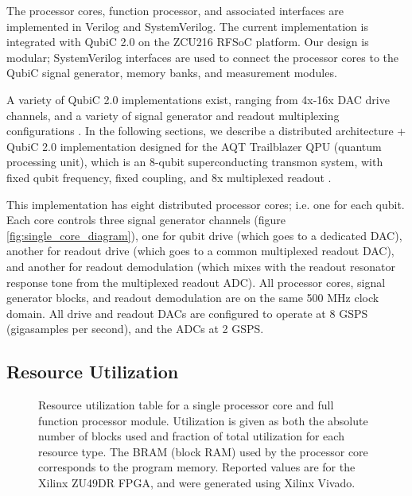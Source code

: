 \documentclass[journal]{IEEEtran}
\begin{document}
The processor cores, function processor, and associated interfaces are implemented in Verilog and SystemVerilog. The current implementation is integrated with QubiC 2.0 on the ZCU216 RFSoC platform. Our design is modular; SystemVerilog interfaces are used to connect the processor cores to the QubiC signal generator, memory banks, and measurement modules. 

A variety of QubiC 2.0 implementations exist, ranging from 4x-16x DAC drive channels, and a variety of signal generator and readout multiplexing configurations \cite{xu2023qubic}. In the following sections, we describe a distributed architecture + QubiC 2.0 implementation designed for the AQT Trailblazer QPU (quantum processing unit), which is an 8-qubit superconducting transmon system, with fixed qubit frequency, fixed coupling, and 8x multiplexed readout \cite{kreikebaum2020improving}. 

This implementation has eight distributed processor cores; i.e. one for each qubit. Each core controls three signal generator channels (figure \ref{fig:single_core_diagram}), one for qubit drive (which goes to a dedicated DAC), another for readout drive (which goes to a common multiplexed readout DAC), and another for readout demodulation (which mixes with the readout resonator response tone from the multiplexed readout ADC). All processor cores, signal generator blocks, and readout demodulation are on the same 500 MHz clock domain. All drive and readout DACs are configured to operate at 8 GSPS (gigasamples per second), and the ADCs at 2 GSPS.

\subsection{Resource Utilization}

\begin{figure}
    \caption{Resource utilization table for a single processor core and full function processor module. Utilization is given as both the absolute number of blocks used and fraction of total utilization for each resource type. The BRAM (block RAM) used by the processor core corresponds to the program memory. Reported values are for the Xilinx ZU49DR FPGA, and were generated using Xilinx Vivado.}
    \label{fig:utilization_table}
\end{figure}
\end{document}
